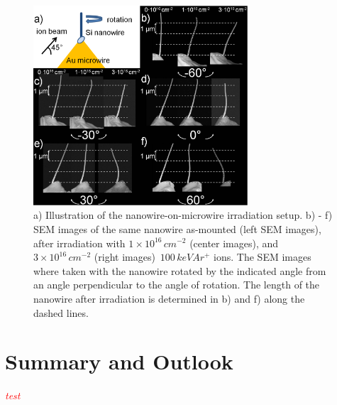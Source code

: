 \documentclass[12pt,
paper=a4,				
DIV=calc,		  %
BCOR=16mm,	  %
headinclude,
openany
]{scrbook}
\newcommand{\TODO}[1]{{\LARGE{\textcolor{red}{\emph {#1 }}}}}
\begin{document}
\begin{figure}[htbp]
	\centering
		\includegraphics[width=8cm]{images/reverseangle.jpg}
	\caption{ a) Illustration of the nanowire-on-microwire irradiation setup. b) - f) SEM images of the same nanowire as-mounted (left SEM images), after irradiation with $1\times10^{16}\,cm^{-2}$  (center images), and $3\times10^{16}\,cm^{-2}$ (right images) $\,100\,keV Ar^+$ ions. The SEM images where taken with the nanowire rotated by the indicated angle from an angle perpendicular to the angle of rotation. The length of the nanowire after irradiation is determined in b) and f) along the dashed lines.}
	\label{reverseangle}
\end{figure}


\chapter{Summary and Outlook}


\TODO{test}



\end{document}
